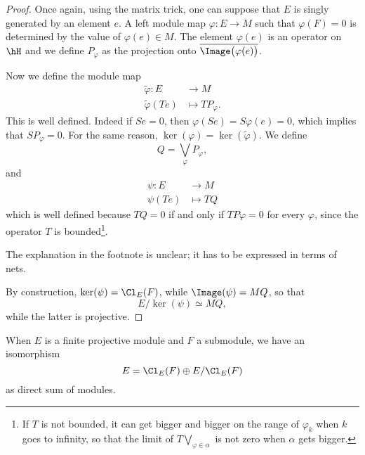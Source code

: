 \begin{proof}
Once again, using the matrix trick, one can suppose that $E$ is singly generated by an element $e$. A left module map $\varphi\colon E\to M$ such that $\varphi(F)=0$ is determined by the value of $\varphi(e)\in M$. The element $\varphi(e)$ is an operator on $\hH$ and we define $P_{\varphi}$ as the projection onto $\overline{ \Image\big( \varphi(e) \big) }$.

Now we define the module map
\begin{equation}
\begin{aligned}
\tilde{\varphi} \colon E&\to M \\ 
   \tilde{\varphi}(Te)&\mapsto TP_{\varphi}. 
\end{aligned}
\end{equation}
This is well defined. Indeed if $Se=0$, then $\varphi(Se)=S\varphi(e)=0$, which implies that $SP_{\varphi}=0$. For the same reason, $\ker(\varphi)=\ker(\tilde{\varphi})$. We define 
\begin{equation}
	Q=\bigvee_{\varphi}P_{\varphi},
\end{equation}
and 
\begin{equation}
\begin{aligned}
 \psi\colon E&\to M \\ 
   \psi(Te)&\mapsto TQ 
\end{aligned}
\end{equation}
which is well defined because $TQ=0$ if and only if $TP\varphi =0$ for every $\varphi$, since the operator $T$ is bounded\footnote{If $T$ is not bounded, it can get bigger and bigger on the range of $\varphi_k$ when $k$ goes to infinity, so that the limit of $T\bigvee_{\varphi\in\alpha}$ is not zero when $\alpha$ gets bigger.}.
\begin{probleme}
The explanation in the footnote is unclear; it has to be expressed in terms of nets.
\end{probleme}
By construction, $\ker(\psi)=\Cl_E(F)$, while $\Image(\psi)=MQ$, so that
\begin{equation}
	E/\ker(\psi)\simeq MQ,
\end{equation}
while the latter is projective.
\end{proof}

\begin{corollary}		\label{CorEfgpFssIsom}
When $E$ is a finite projective module and $F$ a submodule, we have an isomorphism
\[ 
	E=\Cl_E(F)\oplus E/\Cl_E(F)
\]
as direct sum of modules.
\end{corollary}

